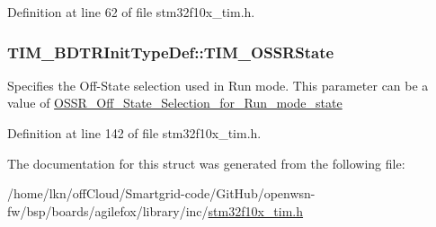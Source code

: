Definition at line 62 of file stm32f10x\+\_\+tim.\+h.

\subsubsection[{\texorpdfstring{T\+I\+M\+\_\+\+O\+S\+S\+R\+State}{TIM_OSSRState}}]{ T\+I\+M\+\_\+\+B\+D\+T\+R\+Init\+Type\+Def\+::\+T\+I\+M\+\_\+\+O\+S\+S\+R\+State}\hypertarget{struct_t_i_m___b_d_t_r_init_type_def_a8f34ad7bc4764bd3ff372cadde468072}{}\label{struct_t_i_m___b_d_t_r_init_type_def_a8f34ad7bc4764bd3ff372cadde468072}
Specifies the Off-\/\+State selection used in Run mode. This parameter can be a value of \hyperlink{group___o_s_s_r___off___state___selection__for___run__mode__state}{O\+S\+S\+R\+\_\+\+Off\+\_\+\+State\+\_\+\+Selection\+\_\+for\+\_\+\+Run\+\_\+mode\+\_\+state} 

Definition at line 142 of file stm32f10x\+\_\+tim.\+h.



The documentation for this struct was generated from the following file\+:\begin{DoxyCompactItemize}
\item 
/home/lkn/off\+Cloud/\+Smartgrid-\/code/\+Git\+Hub/openwsn-\/fw/bsp/boards/agilefox/library/inc/\hyperlink{agilefox_2library_2inc_2stm32f10x__tim_8h}{stm32f10x\+\_\+tim.\+h}\end{DoxyCompactItemize}
